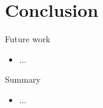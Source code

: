 \section{Conclusion}

\begin{slide}{Future work}
\begin{itemize}
  \item ...
\end{itemize}
\end{slide}

\begin{slide}{Summary}
\begin{itemize}
  \item ...
\end{itemize}
\end{slide}